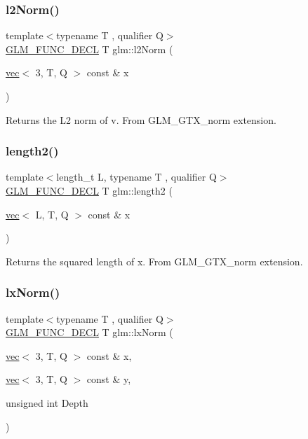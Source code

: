 \subsubsection{\texorpdfstring{l2\+Norm()}{l2Norm()}\hspace{0.1cm}{\footnotesize\ttfamily [2/2]}}
{\footnotesize\ttfamily template$<$typename T , qualifier Q$>$ \\
\mbox{\hyperlink{setup_8hpp_ab2d052de21a70539923e9bcbf6e83a51}{G\+L\+M\+\_\+\+F\+U\+N\+C\+\_\+\+D\+E\+CL}} T glm\+::l2\+Norm (\begin{DoxyParamCaption}\item[{\mbox{\hyperlink{structglm_1_1vec}{vec}}$<$ 3, T, Q $>$ const \&}]{x }\end{DoxyParamCaption})}

Returns the L2 norm of v. From G\+L\+M\+\_\+\+G\+T\+X\+\_\+norm extension. \mbox{\label{group__gtx__norm_ga8d1789651050adb7024917984b41c3de}} 
\subsubsection{\texorpdfstring{length2()}{length2()}}
{\footnotesize\ttfamily template$<$length\+\_\+t L, typename T , qualifier Q$>$ \\
\mbox{\hyperlink{setup_8hpp_ab2d052de21a70539923e9bcbf6e83a51}{G\+L\+M\+\_\+\+F\+U\+N\+C\+\_\+\+D\+E\+CL}} T glm\+::length2 (\begin{DoxyParamCaption}\item[{\mbox{\hyperlink{structglm_1_1vec}{vec}}$<$ L, T, Q $>$ const \&}]{x }\end{DoxyParamCaption})}

Returns the squared length of x. From G\+L\+M\+\_\+\+G\+T\+X\+\_\+norm extension. \mbox{\label{group__gtx__norm_gacad23d30497eb16f67709f2375d1f66a}} 
\subsubsection{\texorpdfstring{lx\+Norm()}{lxNorm()}\hspace{0.1cm}{\footnotesize\ttfamily [1/2]}}
{\footnotesize\ttfamily template$<$typename T , qualifier Q$>$ \\
\mbox{\hyperlink{setup_8hpp_ab2d052de21a70539923e9bcbf6e83a51}{G\+L\+M\+\_\+\+F\+U\+N\+C\+\_\+\+D\+E\+CL}} T glm\+::lx\+Norm (\begin{DoxyParamCaption}\item[{\mbox{\hyperlink{structglm_1_1vec}{vec}}$<$ 3, T, Q $>$ const \&}]{x,  }\item[{\mbox{\hyperlink{structglm_1_1vec}{vec}}$<$ 3, T, Q $>$ const \&}]{y,  }\item[{unsigned int}]{Depth }\end{DoxyParamCaption})}

